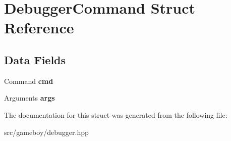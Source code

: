 \hypertarget{structDebuggerCommand}{}\section{Debugger\+Command Struct Reference}
\label{structDebuggerCommand}
\subsection*{Data Fields}
\begin{DoxyCompactItemize}
\item 
\mbox{\label{structDebuggerCommand_a9f3fa447fdedc63659cc3dd75e6bbd41}} 
Command {\bfseries cmd}
\item 
\mbox{\label{structDebuggerCommand_af6535e5e0020c0423e4d4b02c4f20867}} 
Arguments {\bfseries args}
\end{DoxyCompactItemize}


The documentation for this struct was generated from the following file\+:\begin{DoxyCompactItemize}
\item 
src/gameboy/debugger.\+hpp\end{DoxyCompactItemize}
